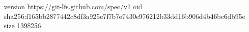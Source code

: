 version https://git-lfs.github.com/spec/v1
oid sha256:f165bb2877442c8df3a925e7f7b7e7430e976212b33dd16b906d4b46bc6db95e
size 1398256
